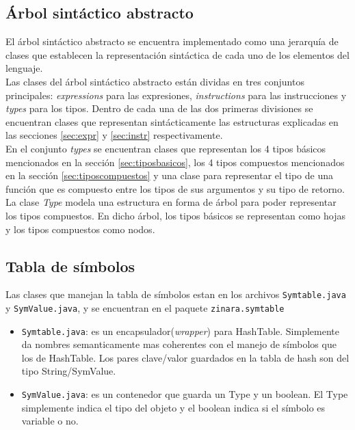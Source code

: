 \documentclass[12pt, spanish]{report}
\begin{document}
\subsection{\'Arbol sint\'actico abstracto}
\label{sec:ast}

El \'arbol sint\'actico abstracto se encuentra implementado como una
jerarqu\'ia de clases que establecen la representaci\'on sint\'actica de
cada uno de los elementos del lenguaje.\\

Las clases del \'arbol sint\'actico abstracto est\'an dividas en tres
conjuntos principales: \emph{expressions} para las expresiones,
\emph{instructions} para las instrucciones y \emph{types} para los
tipos. Dentro de cada una de las dos primeras divisiones se encuentran
clases que representan sint\'acticamente las estructuras explicadas en
las secciones \ref{sec:expr} y \ref{sec:instr} respectivamente.\\

En el conjunto \emph{types} se encuentran clases que representan los 4
tipos b\'asicos mencionados en la secci\'on \ref{sec:tiposbasicos}, los 4
tipos compuestos mencionados en la secci\'on \ref{sec:tiposcompuestos} y una
clase para representar el tipo de una funci\'on que es compuesto entre
los tipos de sus argumentos y su tipo de retorno.\\

La clase \emph{Type} modela una estructura en forma de árbol para
poder representar los tipos compuestos. En dicho árbol, los tipos
básicos se representan como hojas y los tipos compuestos como nodos.

\subsection{Tabla de s\'imbolos}
\label{sec:st}

Las clases que manejan la tabla de s\'imbolos estan en los archivos
\texttt{Symtable.java} y \texttt{SymValue.java}, y se encuentran en el paquete
\texttt{zinara.symtable}

\begin{itemize}
\item \texttt{Symtable.java}: es un encapsulador(\emph{wrapper}) para
  HashTable. Simplemente da nombres semanticamente mas coherentes con
  el manejo de s\'imbolos que los de HashTable. Los pares clave/valor
  guardados en la tabla de hash son del tipo String/SymValue.

\item \texttt{SymValue.java}: es un contenedor que guarda un Type y un
  boolean. El Type simplemente indica el tipo del objeto y el boolean
  indica si el s\'imbolo es variable o no.
\end{itemize}
\end{document}

